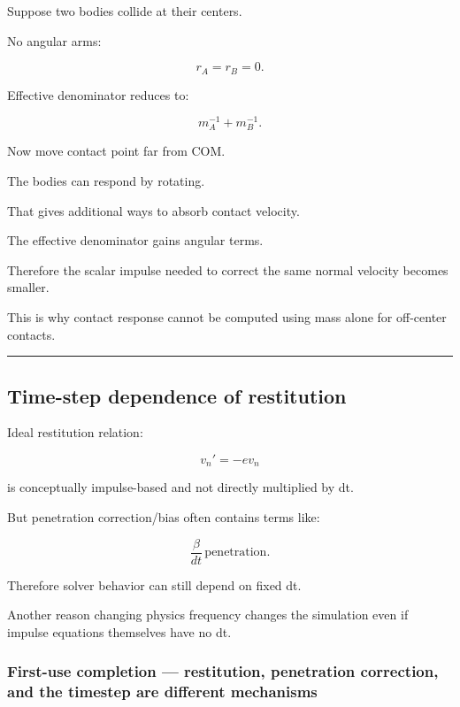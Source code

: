 \hypertarget{06-engine-ii-ch038-why-contact-impulses-depend-on-rotational-inertia}{}

Suppose two bodies collide at their centers.

No angular arms:

\[
r_A=r_B=0.
\]

Effective denominator reduces to:

\[
m_A^{-1}+m_B^{-1}.
\]

Now move contact point far from COM.

The bodies can respond by rotating.

That gives additional ways to absorb contact velocity.

The effective denominator gains angular terms.

Therefore the scalar impulse needed to correct the same normal velocity becomes smaller.

This is why contact response cannot be computed using mass alone for off-center contacts.

\begin{center}\rule{0.5\linewidth}{0.5pt}\end{center}

\subsection{Time-step dependence of restitution}\label{06-engine-ii-ch038-time-step-dependence-of-restitution}

\hypertarget{06-engine-ii-ch038-time-step-dependence-of-restitution}{}

Ideal restitution relation:

\[
v_n'
=
-e v_n
\]

is conceptually impulse-based and not directly multiplied by dt.

But penetration correction/bias often contains terms like:

\[
\frac{\beta}{dt}\,\text{penetration}.
\]

Therefore solver behavior can still depend on fixed dt.

Another reason changing physics frequency changes the simulation even if impulse equations themselves have no dt.

\subsubsection{First-use completion --- restitution, penetration correction, and the timestep are different mechanisms}\label{06-engine-ii-ch038-first-use-completion-restitution-penetration-correction-and-the-timestep-are-different-mechanisms}

